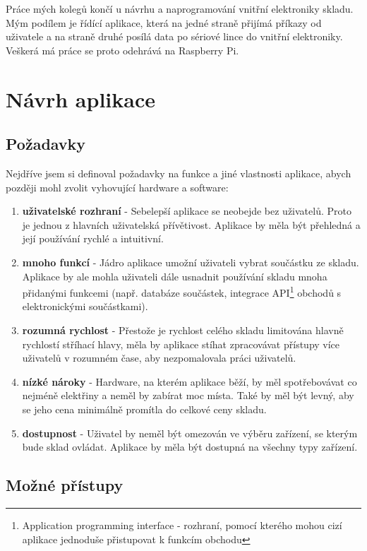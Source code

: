 \documentclass[12pt, a4paper, oneside]{article}
\begin{document}
Práce mých kolegů končí u návrhu a naprogramování vnitřní elektroniky skladu. Mým podílem je řídící aplikace, která na jedné straně přijímá příkazy od uživatele a na straně druhé posílá data po sériové lince do vnitřní elektroniky. Veškerá má práce se proto odehrává na Raspberry Pi.

\newpage

\section{Návrh aplikace}

\subsection{Požadavky}

Nejdříve jsem si definoval požadavky na funkce a jiné vlastnosti aplikace, abych později mohl zvolit vyhovující hardware a software:

\begin{enumerate}
\item \textbf{uživatelské rozhraní} - Sebelepší aplikace se neobejde bez uživatelů. Proto je jednou z hlavních uživatelská přívětivost. Aplikace by měla být přehledná a její používání rychlé a intuitivní.
\item \textbf{mnoho funkcí} - Jádro aplikace umožní uživateli vybrat součástku ze skladu. Aplikace by ale mohla uživateli dále usnadnit používání skladu mnoha přidanými funkcemi (např. databáze součástek, integrace API\footnote{Application programming interface - rozhraní, pomocí kterého mohou cizí aplikace jednoduše přistupovat k funkcím obchodu} obchodů s elektronickými součástkami).
\item \textbf{rozumná rychlost} - Přestože je rychlost celého skladu limitována hlavně rychlostí stříhací hlavy, měla by aplikace stíhat zpracovávat přístupy více uživatelů v rozumném čase, aby nezpomalovala práci uživatelů.
\item \textbf{nízké nároky} - Hardware, na kterém aplikace běží, by měl spotřebovávat co nejméně elektřiny a neměl by zabírat moc místa. Také by měl být levný, aby se jeho cena minimálně promítla do celkové ceny skladu.
\item \textbf{dostupnost} - Uživatel by neměl být omezován ve výběru zařízení, se kterým bude sklad ovládat. Aplikace by měla být dostupná na všechny typy zařízení.
\end{enumerate}

\subsection{Možné přístupy}
\end{document}
